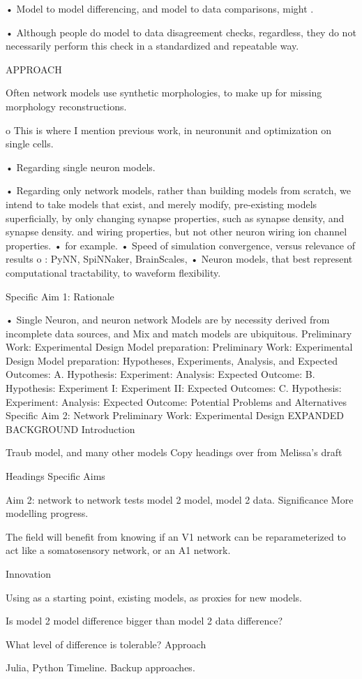 •	Model to model differencing, and model to data comparisons, might . 

•	Although people do model to data disagreement checks, regardless, they do not necessarily perform this check in a standardized and repeatable way.

APPROACH

Often network models use synthetic morphologies, to make up for missing morphology reconstructions.

o	This is where I mention previous work, in neuronunit and optimization on single cells.

•	Regarding single neuron models.

•	Regarding only network models, rather than building models from scratch, we intend to take models that exist, and merely modify, pre-existing models superficially, by only changing synapse properties, such as synapse density, and synapse density. and wiring properties, but not other neuron wiring ion channel properties.
•	for example. 
•	Speed of simulation convergence, versus relevance of results
o	: PyNN, SpiNNaker, BrainScales, 
•	Neuron models, that best represent computational tractability, to waveform flexibility.




Specific Aim 1:
Rationale

•	Single Neuron, and neuron network Models are by necessity derived from incomplete data sources, and Mix and match models are ubiquitous.
Preliminary Work:
Experimental Design Model preparation: 
Preliminary Work:
Experimental Design Model preparation:
Hypotheses, Experiments, Analysis, and Expected Outcomes: 
A. Hypothesis: 
Experiment:
Analysis:
Expected Outcome: 
B. Hypothesis: 
Experiment I: 
Experiment II: 
Expected Outcomes:
C. Hypothesis:
Experiment: 
Analysis: 
Expected Outcome:
Potential Problems and Alternatives
Specific Aim 2: Network
Preliminary Work:
Experimental Design
EXPANDED BACKGROUND 
Introduction




	Traub model, and many other models
Copy headings over from Melissa’s draft

Headings
Specific Aims

Aim 2: network to network tests
model 2 model, model 2 data.
Significance
More modelling progress.

The field will benefit from knowing if an V1 network can be reparameterized to act like a somatosensory network, or an A1 network.

Innovation

Using as a starting point, existing models, as proxies for new models.

Is model 2 model difference bigger than model 2 data difference?

What level of difference is tolerable?
Approach

Julia, Python
Timeline.
Backup approaches.


